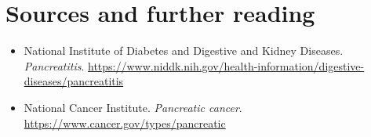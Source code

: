 \section*{Sources and further reading}
\begin{itemize}
\item National Institute of Diabetes and Digestive and Kidney Diseases. \textit{Pancreatitis}. \url{https://www.niddk.nih.gov/health-information/digestive-diseases/pancreatitis}
\item National Cancer Institute. \textit{Pancreatic cancer}. \url{https://www.cancer.gov/types/pancreatic}
\end{itemize}
